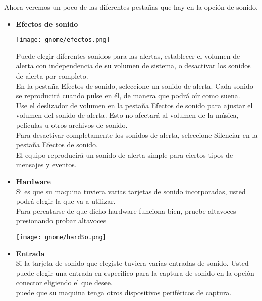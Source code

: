 Ahora veremos un poco de las diferentes pestañas que hay en la opción de sonido.\\
\begin{itemize}
\newpage
\item{\bf Efectos de sonido}\\
\begin{center}
\texttt{[image: gnome/efectos.png]} 
\end{center}
Puede elegir diferentes sonidos para las alertas, establecer el volumen de alerta con independencia de su volumen de sistema, o desactivar los sonidos de alerta por completo.\\

En la pestaña Efectos de sonido, seleccione un sonido de alerta. Cada sonido se reproducirá cuando pulse en él, de manera que podrá oír como suena.\\

Use el deslizador de volumen en la pestaña Efectos de sonido para ajustar el volumen del sonido de alerta. Esto no afectará al volumen de la música, películas u otros archivos de sonido.\\
Para desactivar completamente los sonidos de alerta, seleccione Silenciar en la pestaña Efectos de sonido.\\
El equipo reproducirá un sonido de alerta simple para ciertos tipos de mensajes y eventos.
\item{\bf Hardware}\\
Si es que su maquina tuviera varias tarjetas de sonido incorporadas, usted podrá elegir la que va a utilizar.\\
Para percatarse de que dicho hardware funciona bien, pruebe altavoces presionando \underline{probar altavoces} 
\begin{center}
\texttt{[image: gnome/hardSo.png]} 
\end{center}
\item{\bf Entrada}\\
Si la tarjeta de sonido que elegiste tuviera varias entradas de sonido. Usted puede elegir una entrada en especifico para la captura de sonido en la opción \underline{conector} eligiendo el que desee.\\
puede que su maquina tenga otros dispositivos periféricos de captura.\\


\end{itemize}
